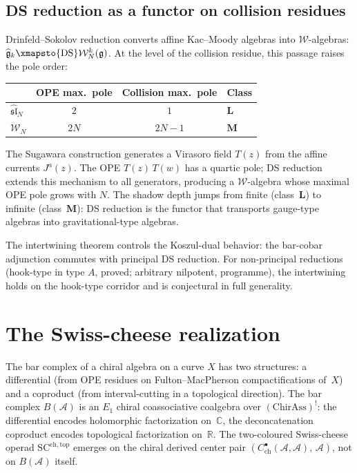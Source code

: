 \documentclass[11pt,reqno]{amsart}
\theoremstyle{definition}
\theoremstyle{remark}
\newcommand{\cA}{\mathcal{A}}
\newcommand{\cW}{\mathcal{W}}
\newcommand{\fg}{\mathfrak{g}}
\numberwithin{equation}{section}
\begin{document}
\subsection{DS reduction as a functor on collision residues}
\label{ssec:ds-reduction}

Drinfeld--Sokolov reduction converts affine Kac--Moody
algebras into $\cW$-algebras:
$\widehat{\fg}_k \xmapsto{\mathrm{DS}}
\cW_N^k(\fg)$. At the level of the collision
residue, this passage raises the pole order:

\begin{center}
\renewcommand{\arraystretch}{1.2}
\begin{tabular}{lccl}
\toprule
& \textbf{OPE max.\ pole} & \textbf{Collision max.\ pole}
 & \textbf{Class} \\
\midrule
$\widehat{\mathfrak{sl}}_N$ & $2$ & $1$ & $\mathbf{L}$ \\
$\cW_N$ & $2N$ & $2N{-}1$ & $\mathbf{M}$ \\
\bottomrule
\end{tabular}
\end{center}

\noindent
The Sugawara construction generates a Virasoro field
$T(z)$ from the affine currents $J^a(z)$. The OPE
$T(z)\,T(w)$ has a quartic pole; DS reduction extends
this mechanism to all generators, producing a
$\cW$-algebra whose maximal OPE pole grows with
$N$. The shadow depth jumps from finite (class~$\mathbf{L}$)
to infinite (class~$\mathbf{M}$): DS reduction is the functor
that transports gauge-type algebras into gravitational-type
algebras.

The intertwining theorem controls the Koszul-dual behavior:
the bar-cobar adjunction commutes with principal DS
reduction. For non-principal reductions~\cite{KRW03}
(hook-type in type $A$, proved; arbitrary nilpotent,
programme), the
intertwining holds on the hook-type corridor and is
conjectural in full generality.


\section{The Swiss-cheese realization}
\label{sec:swiss-cheese}

The bar complex of a chiral algebra on a curve $X$ has two
structures: a differential (from OPE residues on Fulton--MacPherson
compactifications of~$X$) and a coproduct (from interval-cutting
in a topological direction). The bar complex $B(\cA)$ is an $E_1$
chiral coassociative coalgebra over $(\mathrm{ChirAss})^!$: the
differential encodes holomorphic factorization on~$\mathbb{C}$, the
deconcatenation coproduct encodes topological factorization
on~$\mathbb{R}$. The two-coloured Swiss-cheese operad
$\mathrm{SC}^{\mathrm{ch,top}}$ emerges on the chiral derived center
pair $(C^\bullet_{\mathrm{ch}}(\cA,\cA),\, \cA)$, not on $B(\cA)$
itself.
\end{document}

